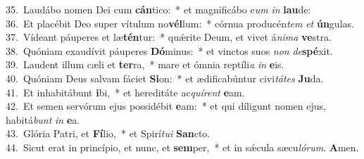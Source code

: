 {35.~}Laudábo nomen Dei cum \textbf{cán}tico:~* et magnificábo e\textit{um} \textit{in} \textbf{lau}de:\\
{36.~}Et placébit Deo super vítulum no\textbf{vél}lum:~* córnua producén\textit{tem} \textit{et} \textbf{ún}gulas.\\
{37.~}Vídeant páuperes et læ\textbf{tén}tur:~* quǽrite Deum, et vivet á\textit{ni}\textit{ma} \textbf{ve}stra.\\
{38.~}Quóniam exaudívit páuperes \textbf{Dó}minus:~* et vinctos suos \textit{non} \textit{de}\textbf{spé}xit.\\
{39.~}Laudent illum cæli et \textbf{ter}ra,~* mare et ómnia reptíli\textit{a} \textit{in} \textbf{e}is.\\
{40.~}Quóniam Deus salvam fáciet \textbf{Si}on:~* et ædificabúntur civi\textit{tá}\textit{tes} \textbf{Ju}da.\\
{41.~}Et inhabitábunt \textbf{i}bi,~* et hereditáte ac\textit{quí}\textit{rent} \textbf{e}am.\\
{42.~}Et semen servórum ejus possidébit \textbf{e}am:~* et qui díligunt nomen ejus, habitá\textit{bunt} \textit{in} \textbf{e}a.\\
{43.~}Glória Patri, et \textbf{Fí}lio,~* et Spirí\textit{tu}\textit{i} \textbf{San}cto.\\
{44.~}Sicut erat in princípio, et nunc, et \textbf{sem}per,~* et in sǽcula sæcu\textit{ló}\textit{rum}. \textbf{A}men.\\

